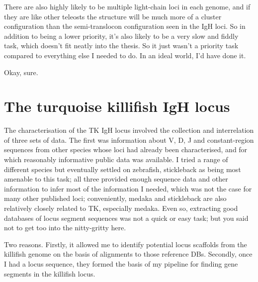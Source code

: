 There are also highly likely to be multiple light-chain loci in each genome, and if they are like other teleosts the structure will be much more of a cluster configuration than the semi-translocon configuration seen in the IgH loci. So in addition to being a lower priority, it's also likely to be a very slow and fiddly task, which doesn't fit neatly into the thesis. So it just wasn't a priority task compared to everything else I needed to do. In an ideal world, I'd have done it.


Okay, sure.

\section{The turquoise killifish IgH locus}


The characterisation of the TK IgH locus  involved the collection and interrelation of three sets of data. The first was information about V, D, J and constant-region sequences from other species whose loci had already been characterised, and for which reasonably informative public data was available. I tried a range of different species but eventually settled on zebrafish, stickleback as being most amenable to this task; all three provided enough sequence data and other information to infer most of the information I needed, which was not the case for many other published loci; conveniently, medaka and stickleback are also relatively closely related to TK, especially medaka. Even so, extracting good databases of locus segment sequences was not a quick or easy task; but you said not to get too into the nitty-gritty here.


Two reasons. Firstly, it allowed me to identify potential locus scaffolds from the killifish genome on the basis of alignments to those reference DBs. Secondly, once I had a locus sequence, they formed the basis of my pipeline for finding gene segments in the killifish locus.



